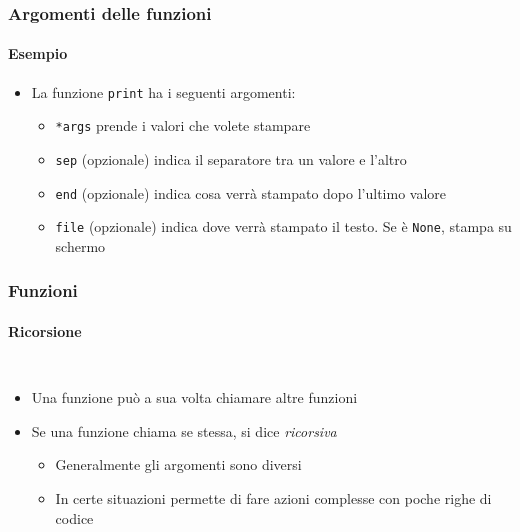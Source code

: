 \begin{exampleframe}
    \frametitle{Argomenti delle funzioni}
    \framesubtitle{Esempio}

    \begin{itemize}
        \item La funzione \texttt{print} ha i seguenti argomenti:\\

        \begin{itemize}
            \item \texttt{*args} prende i valori che volete stampare
            \item \texttt{sep} (opzionale) indica il separatore tra un valore e l'altro
            \item \texttt{end} (opzionale) indica cosa verrà stampato dopo l'ultimo valore
            \item \texttt{file} (opzionale) indica dove verrà stampato il testo. Se è \texttt{None}, stampa su schermo
        \end{itemize}
    \end{itemize}
\end{exampleframe}

\begin{contentframe}
    \frametitle{Funzioni}
    \framesubtitle{Ricorsione}

    \begin{columns}
        \begin{itemize}
            \item Una funzione può a sua volta chiamare altre funzioni
            \bigskip
            \item Se una funzione chiama se stessa, si dice \textit{ricorsiva}
            \begin{itemize}
                \item Generalmente gli argomenti sono diversi
                \item In certe situazioni permette di fare azioni complesse con poche righe di codice
            \end{itemize}
        \end{itemize}
        
        \centering
    \end{columns}
\end{contentframe}

